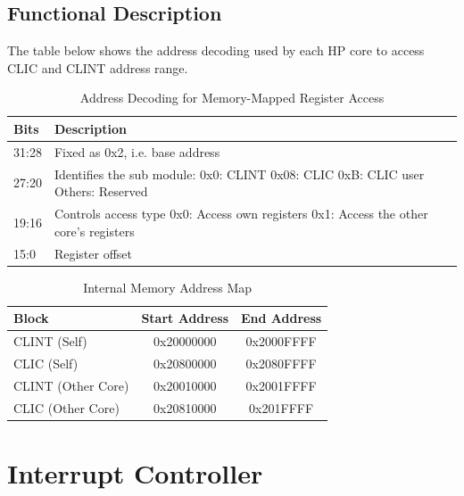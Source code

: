 \documentclass[main\_\_EN.tex]{subfiles}
\begin{document}
\subsection{Functional Description}
\label{sec:riscvcpu-tcip-func-descr}

The table below shows the address decoding used by each HP core to access CLIC and CLINT address range.

\begin{longtable}{ | l | p{5 cm} | }
\caption{Address Decoding for Memory-Mapped Register Access} \label{tab:riscvcpu-tcip-table}
\\ \hline
\rowcolor{lightgray}
Bits & Description \\ \hline
31:28 & Fixed as 0x2, i.e. base address \\ \hline
27:20 & Identifies the sub module: \newline 0x0: CLINT \newline 0x08: CLIC \newline 0xB: CLIC user \newline Others: Reserved \\ \hline
19:16 & Controls access type \newline 0x0: Access own registers \newline 0x1: Access the other core's registers\\ \hline
15:0 & Register offset \\ \hline
\end{longtable}


\begin{longtable}{ | l | c | c |}
\caption{Internal Memory Address Map} \label{tab:riscvcpu-tcip-slave-table}
\\ \hline
\rowcolor{lightgray}
Block & Start Address & End Address \\ \hline
CLINT (Self) & 0x20000000  &  0x2000FFFF\\ \hline
CLIC (Self) & 0x20800000  &  0x2080FFFF\\ \hline
CLINT (Other Core) & 0x20010000  &  0x2001FFFF\\ \hline
CLIC (Other Core) & 0x20810000  &  0x201FFFF\\ \hline
\end{longtable}

\newpage
\section{Interrupt Controller}
\label{sec:riscvcpu-int-ctrl}
\end{document}
